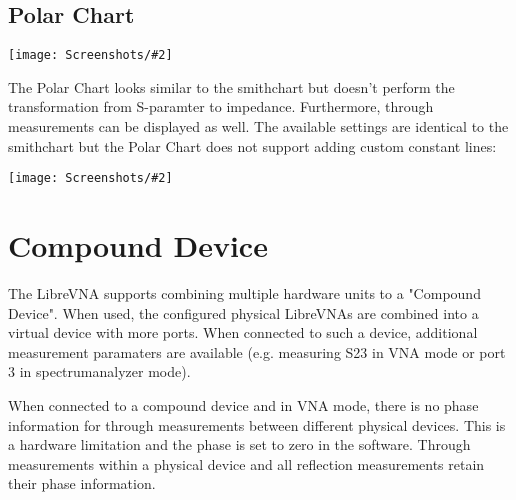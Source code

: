 \documentclass[a4paper,11pt]{article}
\newcommand\danger[1][5ex]{%
  \renewcommand\stacktype{L}%
  \scaleto{\stackon[1.3pt]{\color{red}$\triangle$}{\tiny !}}{#1}%
}
\newenvironment{important}[1][]{%
   \begin{mdframed}[%
      backgroundcolor={red!15}, hidealllines=true,
      skipabove=0.7\baselineskip, skipbelow=0.7\baselineskip,
      splitbottomskip=2pt, splittopskip=4pt, #1]%
   \makebox[0pt]{%
      \smash{%
         \hspace*{-45pt}%
         \raisebox{-5pt}{%
            {\danger}%
         }%
      }%
   }%
}{\end{mdframed}}
\newcommand{\screenshot}[2]{\begin{center}
\texttt{[image: Screenshots/\#2]}
\end{center}}
\begin{document}
\subsection{Polar Chart}
\screenshot{0.6}{GraphPolarplot.png}
The Polar Chart looks similar to the smithchart but doesn't perform the transformation from S-paramter to impedance. Furthermore, through measurements can be displayed as well. The available settings are identical to the smithchart but the Polar Chart does not support adding custom constant lines:
\screenshot{0.6}{GraphPolarchartSetup.png}

\section{Compound Device}
The LibreVNA supports combining multiple hardware units to a "Compound Device". When used, the configured physical LibreVNAs are combined into a virtual device with more ports. When connected to such a device, additional measurement paramaters are available (e.g. measuring S23 in VNA mode or port 3 in spectrumanalyzer mode).

\begin{important}
When connected to a compound device and in VNA mode, there is no phase information for through measurements between different physical devices. This is a hardware limitation and the phase is set to zero in the software. Through measurements within a physical device and all reflection measurements retain their phase information.
\end{important}
\end{document}
